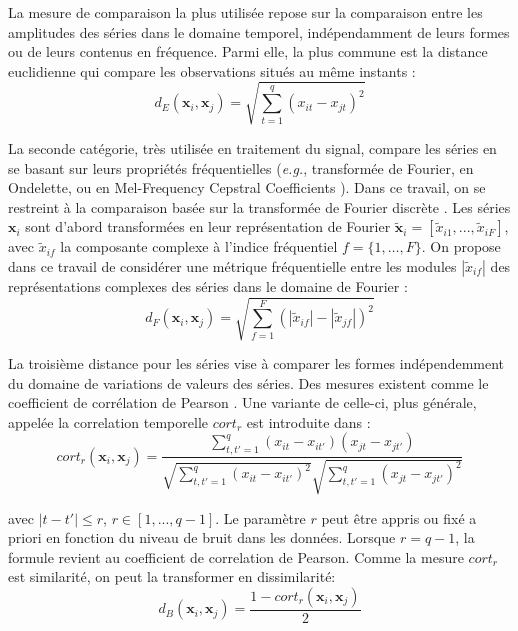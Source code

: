 La mesure de comparaison la plus utilisée repose sur la comparaison entre les amplitudes des séries dans le domaine temporel, indépendamment de leurs formes ou de leurs contenus en fréquence. Parmi elle, la plus commune est la distance euclidienne qui compare les observations situés au même instants \cite{Ding2008}: 
\begin{equation}	
d_E(\textbf{x}_i,\textbf{x}_j) = \sqrt{\sum\limits_{t=1}^{q} (x_{it}-x_{jt})^2}
\label{eq:A}
\end{equation}

La seconde catégorie, très utilisée en traitement du signal, compare les séries en se basant sur leurs propriétés fréquentielles (\textit{e.g.}, transformée de Fourier, en Ondelette, ou en Mel-Frequency Cepstral Coefficients \cite{Sahidullah2012,Torrence1998,Brigham1967}). Dans ce travail, on se restreint à la comparaison basée sur la transformée de Fourier discrète \cite{Lhermitte2011a}. Les séries $\textbf{x}_i$ sont d'abord transformées en leur représentation de Fourier $\tilde{\textbf{x}}_i=[\tilde{x}_{i1}, ...,  \tilde{x}_{iF}]$, avec $\tilde{x}_{if}$ la composante complexe à l'indice fréquentiel $f=\{1,\ldots,F\}$. On propose dans ce travail de considérer une métrique fréquentielle entre les modules $|\tilde{x}_{if}|$ des représentations complexes des séries dans le domaine de Fourier :
\begin{equation}
d_{F}(\textbf{x}_i,\textbf{x}_j) = \sqrt{\sum_{f=1}^{F} 
	(|\tilde{x}_{if}|-|\tilde{x}_{jf}|)^2}
\label{eq:F}
\end{equation}

La troisième distance pour les séries vise à comparer les formes indépendemment du domaine de variations de valeurs des séries. Des mesures existent comme le coefficient de corrélation de Pearson \cite{Abraham2010a,Benesty2009}. Une variante de celle-ci, plus générale, appelée la correlation temporelle $cort_r$ est introduite dans \cite{Douzal-Chouakria2003,AhlameDouzal-Chouakria2012,Chouakria2007} :
\begin{equation}	
cort_r(\textbf{x}_i,\textbf{x}_j) = 
\frac{
	\sum\limits_{t,t'=1}^q 
	{
		(x_{it}-x_{it'})
		(x_{jt}-x_{jt'})
	}
}
{
	\sqrt{
		\sum\limits_{t,t'=1}^q  
		{(x_{it}-x_{it'})^2}
	} 
	\sqrt{
		\sum\limits_{t,t'=1}^q  
		{(x_{jt}-x_{jt'})^2}
	} 	 
}
\label{eq:corTr}
\end{equation}

\noindent avec $|t-t'| \leq r$, $r \in [1,..., q-1]$. Le paramètre $r$ peut être appris ou fixé a priori en fonction du niveau de bruit dans les données. Lorsque $r=q-1$, la formule revient au coefficient de correlation de Pearson. Comme la mesure $cort_r$ est similarité, on peut la transformer en dissimilarité:
\begin{equation}
d_B(\textbf{x}_i,\textbf{x}_j) = \frac{1 - cort_r(\textbf{x}_i,\textbf{x}_j)}{2}
\label{eq:B}
\end{equation}

